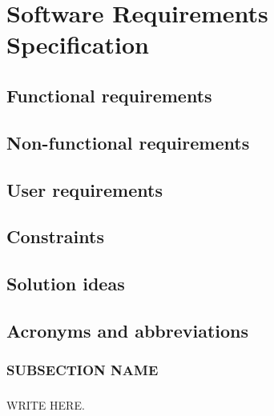 \chapter{Software Requirements Specification}
\section{Functional requirements}
\section{Non-functional requirements}
\section{User requirements}
\section{Constraints}
\section{Solution ideas}
\section{Acronyms and abbreviations}
\subsection{SUBSECTION NAME}
\paragraph{} WRITE HERE.
